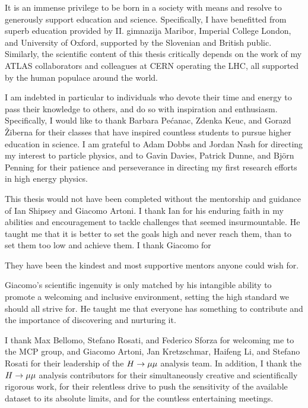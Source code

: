 \begin{acknowledgements}

It is an immense privilege to be born in a society with means and resolve
to generously support education and science. Specifically, I have benefitted
from superb education provided by II. gimnazija Maribor, Imperial College
London, and University of Oxford, supported by the Slovenian and British
public. Similarly, the scientific content of this thesis critically depends
on the work of my ATLAS collaborators and colleagues at CERN operating the
LHC, all supported by the human populace around the world.

I am indebted in particular to individuals who devote their time and energy
to pass their knowledge to others, and do so with inspiration and enthusiasm.
Specifically, I would like to thank Barbara Pe\'canac, Zdenka Keuc, and Gorazd
\v{Z}iberna for their classes that have inspired countless students to pursue
higher education in science. I am grateful to Adam Dobbs and Jordan Nash for
directing my interest to particle physics, and to Gavin Davies, Patrick Dunne,
and Bj\"{o}rn Penning for their patience and perseverance in directing my
first research efforts in high energy physics. 

This thesis would not have been completed without the mentorship and guidance
of Ian Shipsey and Giacomo Artoni. I thank Ian for his enduring faith in my
abilities and encouragement to tackle challenges that seemed insurmountable.
He taught me that it is better to set the goals high and never reach them,
than to set them too low and achieve them.
I thank Giacomo for 


They have been the kindest and most
supportive mentors anyone could wish for.

Giacomo's scientific ingenuity is
only matched by his intangible ability to promote a welcoming and inclusive
environment, setting the high standard we should all strive for. He taught me
that everyone has something to contribute and the importance of discovering 
and nurturing it.

I thank Max Bellomo, Stefano Rosati, and Federico Sforza for welcoming me to the MCP
group, and Giacomo Artoni, Jan Kretzschmar, Haifeng Li, and Stefano Rosati
for their leadership of the $H \rightarrow \mu\mu$ analysis team. In addition, I thank the $H \rightarrow \mu\mu$
analysis contributors for their simultaneously creative and scientifically rigorous work,
for their relentless drive to push the sensitivity of the available dataset to its absolute limits,
and for the countless entertaining meetings.


\end{acknowledgements}
